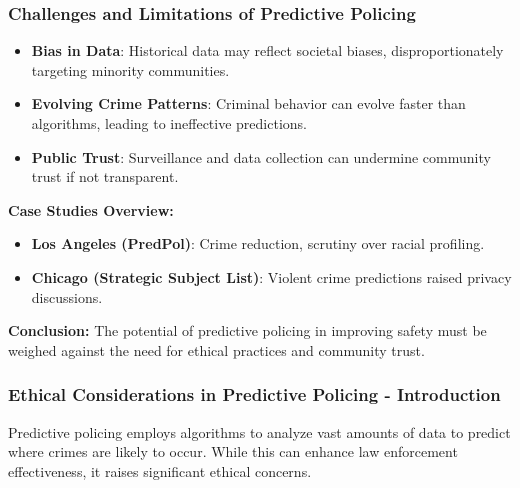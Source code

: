 \documentclass[aspectratio=169]{beamer}
\begin{document}
\begin{frame}[fragile]
    \frametitle{Challenges and Limitations of Predictive Policing}
    \begin{itemize}
        \item \textbf{Bias in Data}: Historical data may reflect societal biases, disproportionately targeting minority communities.
        \item \textbf{Evolving Crime Patterns}: Criminal behavior can evolve faster than algorithms, leading to ineffective predictions.
        \item \textbf{Public Trust}: Surveillance and data collection can undermine community trust if not transparent.
    \end{itemize}
    
    \textbf{Case Studies Overview:}
    \begin{itemize}
        \item \textbf{Los Angeles (PredPol)}: Crime reduction, scrutiny over racial profiling.
        \item \textbf{Chicago (Strategic Subject List)}: Violent crime predictions raised privacy discussions.
    \end{itemize}
    
    \textbf{Conclusion:} The potential of predictive policing in improving safety must be weighed against the need for ethical practices and community trust.
\end{frame}

\begin{frame}[fragile]
    \frametitle{Ethical Considerations in Predictive Policing - Introduction}
    Predictive policing employs algorithms to analyze vast amounts of data to predict where crimes are likely to occur. While this can enhance law enforcement effectiveness, it raises significant ethical concerns.
\end{frame}
\end{document}
